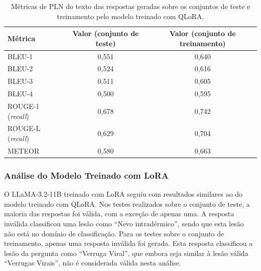 \begin{table}[ht]
    \caption{\small Métricas de \ac{PLN} do texto das respostas geradas sobre os conjuntos de teste e treinamento pelo
    modelo treinado com \ac{QLoRA}.}
    \centering
    \begin{tabular}{l|c|c}
        \hline
        Métrica                        & Valor (conjunto de teste) & Valor (conjunto de treinamento) \\ \hline
        \ac{BLEU}-1                    & 0,551                     & 0,640                           \\
        \ac{BLEU}-2                    & 0,524                     & 0,616                           \\
        \ac{BLEU}-3                    & 0,511                     & 0,605                           \\
        \ac{BLEU}-4                    & 0,500                     & 0,595                           \\
        \hline
        \ac{ROUGE}-1 (\textit{recall}) & 0,678                     & 0,742                           \\
        \ac{ROUGE}-L (\textit{recall}) & 0,629                     & 0,704                           \\
        \hline
        \ac{METEOR}                    & 0,580                     & 0,663                           \\
        \hline
    \end{tabular}
    \label{tab:lladerm_qlora_nlp_metrics}
\end{table}

\subsubsection{Análise do Modelo Treinado com LoRA}

O \ac{LLaMA}-3.2-11B treinado com \ac{LoRA} seguiu com resultados similares ao do modelo treinado com \ac{QLoRA}. Nos
testes realizados sobre o conjunto de teste, a maioria das respostas foi válida, com a exceção de apenas uma. A
resposta inválida classificou uma lesão como ``Nevo intradérmico'', sendo que esta lesão não está no domínio de
classificação. Para os testes sobre o conjunto de treinamento, apenas uma resposta inválida foi gerada. Esta
resposta classificou a lesão da pergunta como ``Verruga Viral'', que embora seja similar à lesão válida ``Verrugas
Virais'', não é considerada válida nesta análise.

